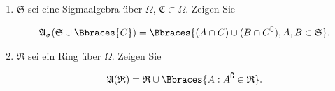 
\begin{exercise}

\phantom{}

\begin{enumerate}[label = (\alph*)]

  \item
  $\mathfrak{S}$ sei eine Sigmaalgebra über $\Omega$, $\mathfrak{C} \subset \Omega$. Zeigen Sie

  \begin{align*}
    \mathfrak{A}_\sigma(\mathfrak{S} \cup \Bbraces{C}) =
    \Bbraces{(A \cap C) \cup (B \cap C^\complement), A, B \in \mathfrak{S}}.
  \end{align*}
  
  \item
  $\mathfrak{R}$ sei ein Ring über $\Omega$. Zeigen Sie
  
  \begin{align*}
    \mathfrak{A}(\mathfrak{R}) =
    \mathfrak{R} \cup \Bbraces{A: A^\complement \in \mathfrak{R}}.
  \end{align*}

\end{enumerate}

\end{exercise}


